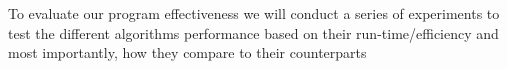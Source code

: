 To evaluate our program effectiveness we will conduct a series of experiments to test the different algorithms performance based on their run-time/efficiency and most importantly, how they compare to their counterparts